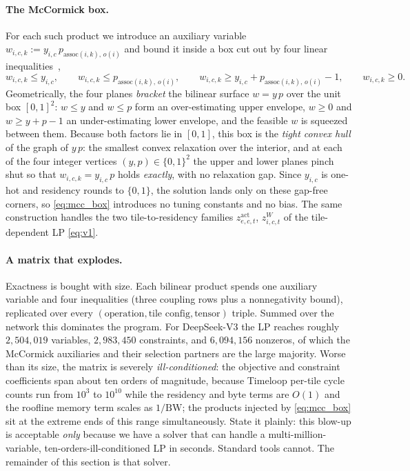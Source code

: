 \paragraph{The McCormick box.}
For each such product we introduce an auxiliary variable
$w_{i,c,k} := y_{i,c}\, p_{\text{assoc}(i,k),\,o(i)}$ and bound it inside a box
cut out by four linear inequalities~\citep{mccormick1976computability},
\begin{equation}
\label{eq:mcc_box}
w_{i,c,k} \le y_{i,c},\qquad
w_{i,c,k} \le p_{\text{assoc}(i,k),\,o(i)},\qquad
w_{i,c,k} \ge y_{i,c} + p_{\text{assoc}(i,k),\,o(i)} - 1,\qquad
w_{i,c,k} \ge 0 .
\end{equation}
Geometrically, the four planes \emph{bracket} the bilinear surface $w=y\,p$
over the unit box $[0,1]^2$: $w\le y$ and $w\le p$ form an over-estimating
upper envelope, $w\ge 0$ and $w\ge y+p-1$ an under-estimating lower envelope,
and the feasible $w$ is squeezed between them. Because both factors lie in
$[0,1]$, this box is the \emph{tight convex hull} of the graph of $y\,p$: the
smallest convex relaxation over the interior, and at each of the four integer
vertices $(y,p)\in\{0,1\}^2$ the upper and lower planes pinch shut so that
$w_{i,c,k}=y_{i,c}\,p$ holds \emph{exactly}, with no relaxation gap. Since
$y_{i,c}$ is one-hot and residency rounds to $\{0,1\}$, the solution lands
only on these gap-free corners, so \eqref{eq:mcc_box} introduces no tuning
constants and no bias. The same construction handles the two tile-to-residency
families $z^{\mathrm{act}}_{e,c,t}$, $z^{W}_{i,c,t}$ of the tile-dependent
LP \eqref{eq:v1}.

\paragraph{A matrix that explodes.}
Exactness is bought with size. Each bilinear product spends one auxiliary
variable and four inequalities (three coupling rows plus a nonnegativity
bound), replicated over every $(\text{operation},\text{tile
config},\text{tensor})$ triple. Summed over the network this dominates the
program. For DeepSeek-V3 the \Vone{} LP reaches roughly $2{,}504{,}019$
variables, $2{,}983{,}450$ constraints, and $6{,}094{,}156$ nonzeros, of which
the McCormick auxiliaries and their selection partners are the large majority.
Worse than its size, the matrix is severely \emph{ill-conditioned}: the
objective and constraint coefficients span about ten orders of magnitude,
because Timeloop per-tile cycle counts run from $10^{3}$ to $10^{10}$ while the
residency and byte terms are $O(1)$ and the roofline memory term scales as
$1/\text{BW}$; the products injected by \eqref{eq:mcc_box} sit at the extreme
ends of this range simultaneously. State it plainly: this blow-up is
acceptable \emph{only} because we have a solver that can handle a
multi-million-variable, ten-orders-ill-conditioned LP in seconds. Standard
tools cannot. The remainder of this section is that solver.

